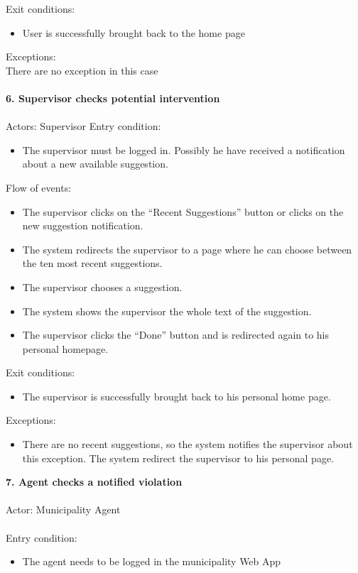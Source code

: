 \documentclass[a4paper]{report}
\begin{document}
Exit conditions:
\begin{itemize}
\item User is successfully brought back to the home page
\end{itemize}
Exceptions: \\There are no exception in this case
\\ \\
\textbf{6. Supervisor checks potential intervention}
\\ \\
Actors: Supervisor
Entry condition: 
\begin{itemize}
\item The supervisor must be logged in. Possibly he have received a notification about a new available suggestion. 
\end{itemize}
Flow of events:
\begin{itemize}
\item The supervisor clicks on the “Recent Suggestions” button or clicks on the new suggestion notification.
\item The system redirects the supervisor to a page where he can choose between the ten most recent suggestions.
\item The supervisor chooses a suggestion.
\item The system shows the supervisor the whole text of the suggestion.
\item The supervisor clicks the “Done” button and is redirected again to his personal homepage.
\end{itemize}
Exit conditions:
\begin{itemize}
\item The supervisor is successfully brought back to his personal home page.
\end{itemize}
Exceptions:
\begin{itemize}
\item There are no recent suggestions, so the system notifies the supervisor about this exception. The system redirect the supervisor to his personal page.
\end{itemize}
\textbf{7. Agent checks a notified violation}
\\ \\
Actor: Municipality Agent \\ \\
Entry condition: 	
\begin{itemize}
\item The agent needs to be logged in the municipality Web App
\end{itemize}
\end{document}
